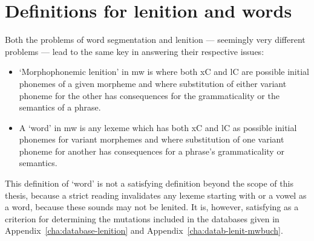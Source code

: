 \section{Definitions for lenition and words}

Both the problems of word segmentation and lenition --- seemingly very different problems --- lead to the same key in answering their respective issues: 
\begin{itemize}
\item `Morphophonemic lenition' in \gls{mw} is where both \gls{x}\gls{C}  and \gls{l}\gls{C} are possible initial phonemes of a given morpheme and where  substitution of either variant phoneme for the other has consequences for the grammaticality or the semantics of a phrase.
\item A `word' in \gls{mw} is any lexeme which has both \gls{x}\gls{C} and \gls{l}\gls{C} as possible initial phonemes for variant morphemes and where  substitution of one variant phoneme for another has consequences for a phrase's grammaticality or semantics.
\end{itemize}
This definition of `word' is not a satisfying definition beyond the scope of this thesis, because a strict reading  invalidates any lexeme starting with  or a vowel as a word, because these sounds may not be lenited. It is, however, satisfying as a criterion for determining the mutations included in the databases  given in Appendix~\ref{cha:database-lenition} and Appendix~\ref{cha:datab-lenit-mwbuch}.


